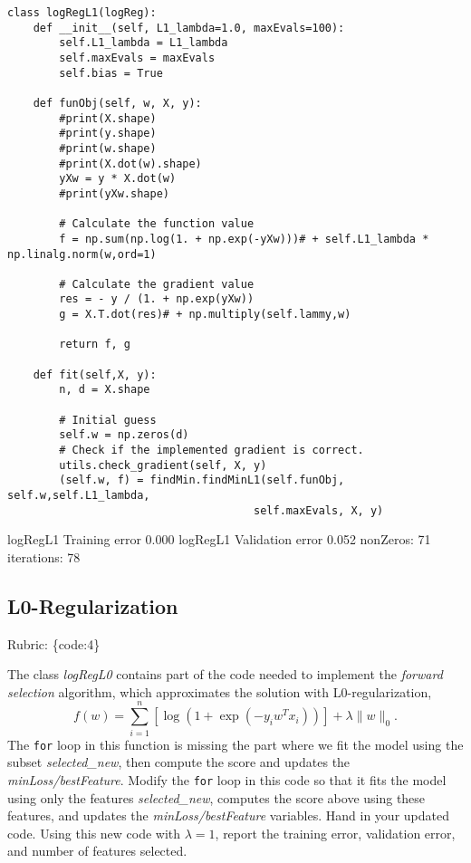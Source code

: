 \documentclass{article}
\def\rubric#1{\gre{Rubric: \{#1\}}}{}
\def\blu#1{{\color{blu}#1}}
\def\gre#1{{\color{gre}#1}}
\def\red#1{{\color{red}#1}}
\def\norm#1{\|#1\|}
\begin{document}
\begin{lstlisting}
class logRegL1(logReg):
    def __init__(self, L1_lambda=1.0, maxEvals=100):
        self.L1_lambda = L1_lambda
        self.maxEvals = maxEvals
        self.bias = True

    def funObj(self, w, X, y):
        #print(X.shape)
        #print(y.shape)
        #print(w.shape)
        #print(X.dot(w).shape)
        yXw = y * X.dot(w)
        #print(yXw.shape)

        # Calculate the function value
        f = np.sum(np.log(1. + np.exp(-yXw)))# + self.L1_lambda * np.linalg.norm(w,ord=1)

        # Calculate the gradient value
        res = - y / (1. + np.exp(yXw))
        g = X.T.dot(res)# + np.multiply(self.lammy,w)

        return f, g

    def fit(self,X, y):
        n, d = X.shape

        # Initial guess
        self.w = np.zeros(d)
        # Check if the implemented gradient is correct.
        utils.check_gradient(self, X, y)
        (self.w, f) = findMin.findMinL1(self.funObj, self.w,self.L1_lambda,
                                      self.maxEvals, X, y)
\end{lstlisting}
\red{
logRegL1 Training error 0.000   \newline
logRegL1 Validation error 0.052 \newline
nonZeros: 71  \newline
iterations: 78
}


\subsection{L0-Regularization}
\rubric{code:4}

The class \emph{logRegL0} contains part of the code needed to implement the \emph{forward selection} algorithm,
which approximates the solution with L0-regularization,
\[
f(w) =  \sum_{i=1}^n \left[\log(1+\exp(-y_iw^Tx_i))\right] + \lambda\norm{w}_0.
\]
The \texttt{for} loop in this function is missing the part where we fit the model using the subset \emph{selected\_new},
then compute the score and updates the \emph{minLoss/bestFeature}.
Modify the \texttt{for} loop in this code so that it fits the model using only
the features \emph{selected\_new}, computes the score above using these features,
and updates the \emph{minLoss/bestFeature} variables.
\blu{Hand in your updated code. Using this new code with $\lambda=1$,
report the training error, validation error, and number of features selected.}
\end{document}
